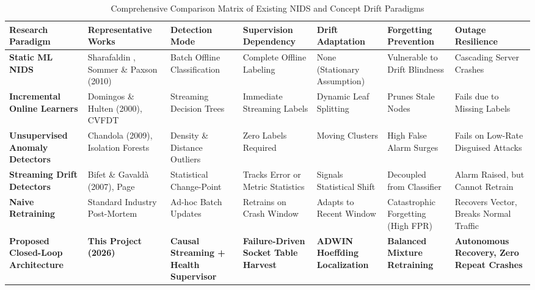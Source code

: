 \documentclass[12pt,a4paper,oneside]{report}
\begin{document}
\begin{table}[H]
\caption{Comprehensive Comparison Matrix of Existing NIDS and Concept Drift Paradigms}
\centering
\small
\begin{tabularx}{\textwidth}{l p{2.4cm} p{2.2cm} p{2.2cm} p{2.2cm} p{2.2cm} p{2.4cm}}
\toprule
\textbf{Research Paradigm} & \textbf{Representative Works} & \textbf{Detection Mode} & \textbf{Supervision Dependency} & \textbf{Drift Adaptation} & \textbf{Forgetting Prevention} & \textbf{Outage Resilience} \\
\midrule
\textbf{Static ML NIDS} & Sharafaldin \cite{sharafaldin2018}, Sommer \& Paxson (2010) & Batch Offline Classification & Complete Offline Labeling & None (Stationary Assumption) & Vulnerable to Drift Blindness & Cascading Server Crashes \\
\addlinespace
\textbf{Incremental Online Learners} & Domingos \& Hulten (2000), CVFDT & Streaming Decision Trees & Immediate Streaming Labels & Dynamic Leaf Splitting & Prunes Stale Nodes & Fails due to Missing Labels \\
\addlinespace
\textbf{Unsupervised Anomaly Detectors} & Chandola (2009), Isolation Forests & Density \& Distance Outliers & Zero Labels Required & Moving Clusters & High False Alarm Surges & Fails on Low-Rate Disguised Attacks \\
\addlinespace
\textbf{Streaming Drift Detectors} & Bifet \& Gavald\`{a} (2007), Page \cite{page1954} & Statistical Change-Point & Tracks Error or Metric Statistics & Signals Statistical Shift & Decoupled from Classifier & Alarm Raised, but Cannot Retrain \\
\addlinespace
\textbf{Naive Retraining} & Standard Industry Post-Mortem & Ad-hoc Batch Updates & Retrains on Crash Window & Adapts to Recent Window & Catastrophic Forgetting (High FPR) & Recovers Vector, Breaks Normal Traffic \\
\addlinespace
\textbf{Proposed Closed-Loop Architecture} & \textbf{This Project (2026)} & \textbf{Causal Streaming + Health Supervisor} & \textbf{Failure-Driven Socket Table Harvest} & \textbf{ADWIN Hoeffding Localization} & \textbf{Balanced Mixture Retraining} & \textbf{Autonomous Recovery, Zero Repeat Crashes} \\
\bottomrule
\end{tabularx}
\label{tab:lit_matrix}
\end{table}
\end{document}
